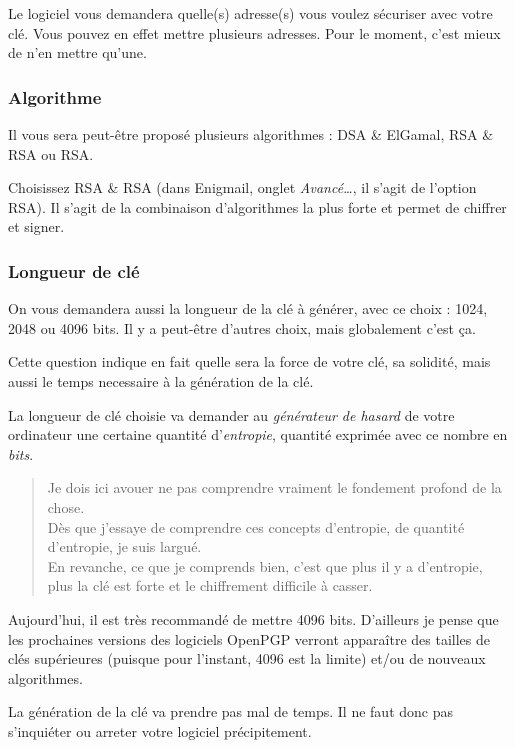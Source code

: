 Le logiciel vous demandera quelle(s) adresse(s) vous voulez sécuriser
avec votre clé. Vous pouvez en effet mettre plusieurs adresses. Pour le
moment, c'est mieux de n'en mettre qu'une.

\subsubsection{Algorithme}\label{algorithme}

Il vous sera peut-être proposé plusieurs algorithmes : DSA \& ElGamal,
RSA \& RSA ou RSA.

Choisissez RSA \& RSA (dans Enigmail, onglet \emph{Avancé\ldots{}}, il
s'agit de l'option RSA). Il s'agit de la combinaison d'algorithmes la
plus forte et permet de chiffrer et signer.

\subsubsection{Longueur de clé}\label{longueur-de-cluxe9}

On vous demandera aussi la longueur de la clé à générer, avec ce choix :
1024, 2048 ou 4096 bits. Il y a peut-être d'autres choix, mais
globalement c'est ça.

Cette question indique en fait quelle sera la force de votre clé, sa
solidité, mais aussi le temps necessaire à la génération de la clé.

La longueur de clé choisie va demander au \emph{générateur de hasard} de
votre ordinateur une certaine quantité d'\emph{entropie}, quantité
exprimée avec ce nombre en \emph{bits}.

\begin{quote}
Je dois ici avouer ne pas comprendre vraiment le fondement profond de la
chose.\\Dès que j'essaye de comprendre ces concepts d'entropie, de
quantité d'entropie, je suis largué.\\En revanche, ce que je comprends
bien, c'est que plus il y a d'entropie, plus la clé est forte et le
chiffrement difficile à casser.
\end{quote}

Aujourd'hui, il est très recommandé de mettre 4096 bits. D'ailleurs je
pense que les prochaines versions des logiciels OpenPGP verront
apparaître des tailles de clés supérieures (puisque pour l'instant, 4096
est la limite) et/ou de nouveaux algorithmes.

La génération de la clé va prendre pas mal de temps. Il ne faut donc pas
s'inquiéter ou arreter votre logiciel précipitement.

